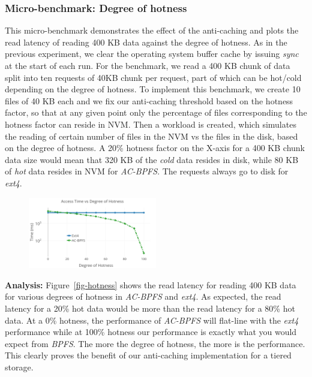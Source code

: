 \subsubsection{Micro-benchmark: Degree of hotness}
This micro-benchmark demonstrates the effect of the anti-caching and plots the read latency of reading 400 KB data against the degree of hotness. As in the previous experiment, we clear the operating system buffer cache by issuing \textit{sync} at the start of each run. For the benchmark, we read a 400 KB chunk of data split into ten requests of 40KB chunk per request, part of which can be hot/cold depending on the degree of hotness. To implement this benchmark, we create 10 files of 40 KB each and we fix our anti-caching threshold based on the hotness factor, so that at any given point only the percentage of files corresponding to the hotness factor can reside in NVM. Then a workload is created, which simulates the reading of certain number of files in the NVM vs the files in the disk, based on the degree of hotness. A 20\% hotness factor on the X-axis for a 400 KB chunk data size would mean that 320 KB of the \textit{cold} data resides in disk, while 80 KB of \textit{hot} data resides in NVM for \textit{AC-BPFS}. The requests always go to disk for \textit{ext4}.

\begin{figure}
\centering
\includegraphics[width=0.5\textwidth]{figs/hotness.png}
\end{figure}

\textbf{Analysis:} Figure~\ref{fig-hotness} shows the read latency for reading 400 KB data for various degrees of hotness in \textit{AC-BPFS} and \textit{ext4}. As expected, the read latency for a 20\% hot data would be more than the read latency for a 80\% hot data. At a 0\% hotness, the performance of \textit{AC-BPFS} will flat-line with the \textit{ext4} performance while at 100\% hotness our performance is exactly what you would expect from \textit{BPFS}. The more the degree of hotness, the more is the performance. This clearly proves the benefit of our anti-caching implementation for a tiered storage.

